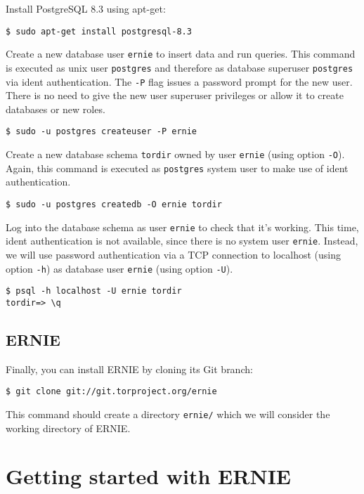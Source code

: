 \documentclass{article}
\begin{document}
Install PostgreSQL 8.3 using apt-get:

\begin{verbatim}
$ sudo apt-get install postgresql-8.3
\end{verbatim}

Create a new database user \verb+ernie+ to insert data and run queries.
This command is executed as unix user \verb+postgres+ and therefore as
database superuser \verb+postgres+ via ident authentication. The
\verb+-P+ flag issues a password prompt for the new user.
There is no need to give the new user superuser privileges or allow it to
create databases or new roles.

\begin{verbatim}
$ sudo -u postgres createuser -P ernie
\end{verbatim}

Create a new database schema \verb+tordir+ owned by user \verb+ernie+
(using option \verb+-O+).
Again, this command is executed as \verb+postgres+ system user to make use
of ident authentication.

\begin{verbatim}
$ sudo -u postgres createdb -O ernie tordir
\end{verbatim}

Log into the database schema as user \verb+ernie+ to check that it's
working.
This time, ident authentication is not available, since there is no system
user \verb+ernie+.
Instead, we will use password authentication via a TCP connection to
localhost (using option \verb+-h+) as database user \verb+ernie+ (using
option \verb+-U+).

\begin{verbatim}
$ psql -h localhost -U ernie tordir
tordir=> \q
\end{verbatim}

\subsection{ERNIE}

Finally, you can install ERNIE by cloning its Git branch: 

\begin{verbatim}
$ git clone git://git.torproject.org/ernie
\end{verbatim}

This command should create a directory \verb+ernie/+ which we will
consider the working directory of ERNIE.

\section{Getting started with ERNIE}
\end{document}
